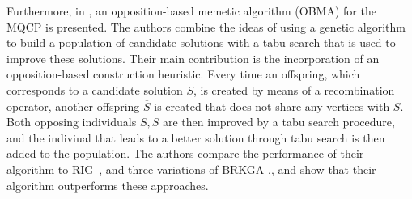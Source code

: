 \documentclass[draft,final]{vutinfth} %
\begin{document}
Furthermore, in \cite{zhou_opposition-based_2020}, an opposition-based memetic algorithm (OBMA) for the MQCP is presented. The authors combine the ideas of using a genetic algorithm to build a population of candidate solutions with a tabu search that is used to improve these solutions. Their main contribution is the incorporation of an opposition-based construction heuristic. Every time an offspring, which corresponds to a candidate solution $S$, is created by means of a recombination operator, another offspring $\overline{S}$ is created that does not share any vertices with $S$. Both opposing individuals $S, \overline{S}$ are then improved by a tabu search procedure, and the indiviual that leads to a better solution through tabu search is then added to the population. The authors compare the performance of their algorithm to RIG~\cite{oliveira2013construction}, and three variations of BRKGA \cite{pinto2015biased},\cite{pinto_biased_2018}, \cite{pinto2021brkga} and show that their algorithm outperforms these approaches.
\end{document}
